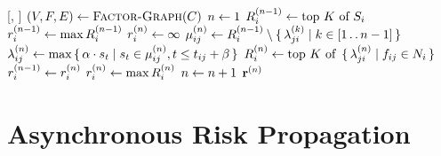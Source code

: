\begin{function}[H]{\nSyncRiskProp}[\vScores, \vContacts]
  \State $(\vVariables, \vFactors, \vEdges) \assign \Call{Factor-Graph}{\vContacts}$
  \State $n \leftarrow 1$
  \ForEach{$\vVariable[i] \in \vVariables$}
    \State $\vIndexedExpScores{i}{n - 1} \assign \topK{\vScores_i}$
    \State $\vIndexedMaxExpScores[i]{n - 1} \assign \max \vIndexedExpScores{i}{n - 1}$
    \State $\vIndexedMaxExpScores[i]{n} \assign \infty$
  \EndFor
    \ForEach{$\{\vVariable[i], \vFactor[ij]\} \in \vEdges$}
      \State $\vVariableMsg{i}{j}{n} \assign \vIndexedExpScores{i}{n - 1} \setminus \setBuilder{\vFactorMsg{j}{i}{k}}{k \in [1 \ltwodots n - 1]}$
    \EndFor
    \ForEach{$\{\vVariable[i], \vFactor[ij]\} \in \vEdges$}
      \State $\lambda_{ij}^{(n)} \leftarrow \max \set{ \alpha\cdot s_t | s_t \in \mu_{ij}^{(n)}, t \leq t_{ij} + \beta}$
    \EndFor
    \ForEach{$\vVariable[i] \in \vVariables$}
      \State $\vIndexedExpScores{i}{n} \assign \topK{\setBuilder{\vFactorMsg{j}{i}{n}}{\vFactor[ij] \in \vNeighbors_i}}$
    \EndFor
    \ForEach{$\vVariable[i] \in \vVariables$}
      \State $\vIndexedMaxExpScores[i]{n - 1} \assign \vIndexedMaxExpScores[i]{n}$
      \State $\vIndexedMaxExpScores[i]{n} \assign \max \vIndexedExpScores{i}{n}$
    \EndFor
    \State $n \leftarrow n + 1$
  \EndWhile
  \State \Return $\vIndexedMaxExpScores{n}$
\end{function}

\section{Asynchronous Risk Propagation}\label{sec:asynchronous}

%


